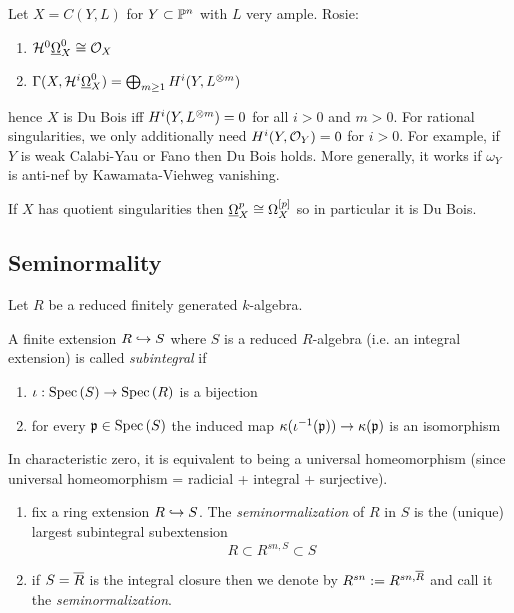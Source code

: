 \documentclass[12pt]{article}
\renewcommand{\cH}{\mathcal{H}}
\begin{document}
\begin{example}
Let $X = C(Y,L)$ for $Y \subset \P^n$ with $L$ very ample. Rosie:
\begin{enumerate}
\item $\cH^0 \ul{\Omega}_X^0 \cong \struct{X}$
\item $\Gamma(X, \cH^i \ul{\Omega}_X^0) = \bigoplus_{m \ge 1} H^i(Y, L^{\ot m})$ 
\end{enumerate}
hence $X$ is Du Bois iff $H^i(Y, L^{\ot m}) = 0$ for all $i > 0$ and $m > 0$. 
For rational singularities, we only additionally need $H^i(Y, \struct{Y}) = 0$ for $i > 0$. For example, if $Y$ is weak Calabi-Yau or Fano then Du Bois holds. More generally, it works if $\omega_Y$ is anti-nef by Kawamata-Viehweg vanishing. 
\end{example}

\begin{example}
If $X$ has quotient singularities then $\ul{\Omega}_X^p \cong \Omega_X^{[p]}$ so in particular it is Du Bois. 
\end{example}

\subsection{Seminormality}

Let $R$ be a reduced finitely generated $k$-algebra. 

\begin{defn}
A finite extension $R \embed S$ where $S$ is a reduced $R$-algebra (i.e. an integral extension) is called \textit{subintegral} if
\begin{enumerate}
\item $\iota : \Spec{S} \to \Spec{R}$ is a bijection
\item for every $\p \in \Spec{S}$ the induced map $\kappa(\iota^{-1}(\p)) \to \kappa(\p)$ is an isomorphism
\end{enumerate}
\end{defn}

\begin{rmk}
In characteristic zero, it is equivalent to being a universal homeomorphism (since universal homeomorphism = radicial + integral + surjective).
\end{rmk}

\begin{defn}
\begin{enumerate}
\item fix a ring extension $R \embed S$. The \textit{seminormalization} of $R$ in $S$ is the (unique) largest subintegral subextension
\[ R \subset R^{sn, S} \subset S \]
\item if $S = \ol{R}$ is the integral closure then we denote by $R^{sn} := R^{sn, \ol{R}}$ and call it the \textit{seminormalization}. 
\end{enumerate}
\end{defn}
\end{document}
